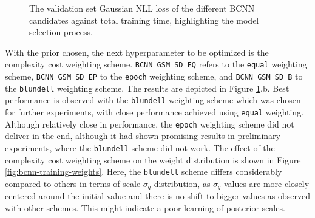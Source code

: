 \begin{figure}[H]
	\centering
	\caption{The validation set Gaussian NLL loss of the different BCNN candidates against total training time, highlighting the model selection process.}
	\label{fig:convergence-bcnn}
\end{figure}

With the prior chosen, the next hyperparameter to be optimized is the complexity cost weighting scheme. \texttt{BCNN GSM SD EQ} refers to the \texttt{equal} weighting scheme, \texttt{BCNN GSM SD EP} to the \texttt{epoch} weighting scheme, and \texttt{BCNN GSM SD B} to the \texttt{blundell} weighting scheme. The results are depicted in Figure \ref{fig:convergence-bcnn}.b. Best performance is observed with the \texttt{blundell} weighting scheme which was chosen for further experiments, with close performance achieved using \texttt{equal} weighting. Although relatively close in performance, the \texttt{epoch} weighting scheme did not deliver in the end, although it had shown promising results in preliminary experiments, where the \texttt{blundell} scheme did not work. The effect of the complexity cost weighting scheme on the weight distribution is shown in Figure \ref{fig:bcnn-training-weights}. Here, the \texttt{blundell} scheme differs considerably compared to others in terms of scale $\sigma_q$ distribution, as $\sigma_q$ values are more closely centered around the initial value and there is no shift to bigger values as observed with other schemes. This might indicate a poor learning of posterior scales.

